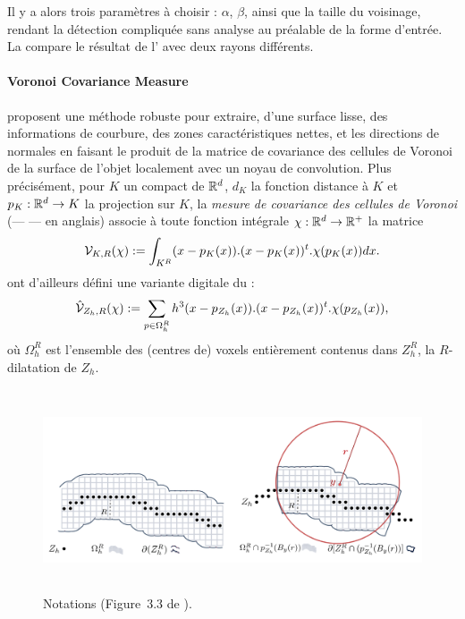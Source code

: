 %
Il y a alors trois paramètres à choisir : $\alpha$, $\beta$, ainsi que la
taille du voisinage, rendant la détection compliquée sans analyse au préalable
de la forme d'entrée. La  compare le résultat de l' avec deux rayons différents.
%
\paragraph{Voronoi Covariance Measure}
%
 proposent une méthode robuste pour
extraire, d'une surface lisse, des informations de courbure, des zones caractéristiques
nettes, et les directions de normales en faisant le produit de la matrice de
covariance des cellules de Voronoi de la surface de l'objet localement avec un
noyau de convolution.
%
%
Plus précisément, pour $K$ un compact de $\mathbb{R}^d$, $d_K$ la fonction distance à
$K$ et $p_K : \mathbb{R}^d \rightarrow K$ la projection sur $K$, la \emph{mesure de
covariance des cellules de Voronoi} (\VCMM --- \VCM --- en anglais) associe à toute
fonction intégrale $\chi : \mathbb{R}^d \rightarrow \mathbb{R}^+$ la matrice
%
\begin{equation}
  \mathcal{V}_{K,R}(\chi) := \int_{K^R} (x - p_K(x)) . (x - p_K(x))^t . \chi(p_K(x))dx \text{.}
\end{equation}
%
 ont d'ailleurs défini une variante digitale du
\VCM :
%
\begin{equation}
  \hat{\mathcal{V}}_{Z_h,R}(\chi) := \sum_{p \in \Omega_h^R} h^3 (x - p_{Z_h}(x)) . (x - p_{Z_h}(x))^t . \chi(p_{Z_h}(x)) \text{,}
\end{equation}
%
où $\Omega_h^R$ est l'ensemble des (centres de) voxels entièrement contenus dans
$Z_h^R$, la $R$-dilatation de $Z_h$.
%
\begin{figure}[ht]{
    \begin{center}
    \includegraphics[height=6cm]{images/Feature/VCMd_notations}
    \end{center}}
    \caption[Notations.]{Notations (Figure~3.3 de \cite{Cuel2014These}).
      \label{fig:mellado-multiscale}}
\end{figure}

